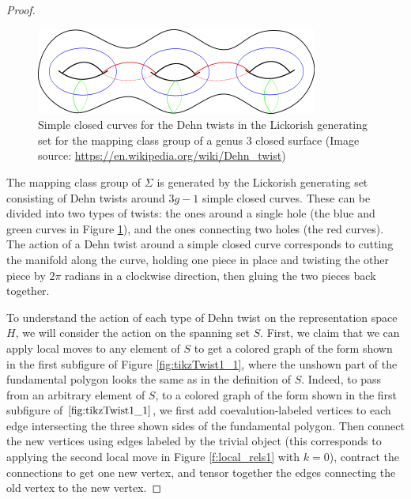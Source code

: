 \documentclass{amsart}
\newcommand{\Si}{\Sigma}
\begin{document}
\begin{proof}
\begin{figure}
 \centering
 \includegraphics[width=.60\textwidth]{lickorish.png}
 \caption{Simple closed curves for the Dehn twists in the Lickorish generating set for the mapping class group of a genus $3$ closed surface (Image source: \url{https://en.wikipedia.org/wiki/Dehn_twist})}
\label{fig:lickorish}
\end{figure}



The mapping class group of $\Si$ is generated by the Lickorish generating set consisting of Dehn twists around $3g-1$ simple closed curves.   These can be divided into two types of twists: the ones around a single hole (the blue and green curves in Figure \ref{fig:lickorish}), and the ones connecting two holes (the red curves). The action of a Dehn twist around a simple closed curve corresponds to cutting the manifold along the curve, holding one piece in place and twisting the other piece by $2\pi$ radians in a clockwise direction, then gluing the two pieces back together.


To understand the action of each type of Dehn twist on the representation space $H$, we will consider the action on the spanning set $S$.  First, we claim that we can apply local moves to any element of $S$ to get a colored graph of the form shown in the first subfigure of Figure \ref{fig:tikzTwist1_1}, where the unshown part of the fundamental polygon looks the same as in the definition of $S$.  Indeed, to pass from an arbitrary element of $S$, to a colored graph of the form shown in the first subfigure of $\ref{fig:tikzTwist1_1}$, we first add coevalution-labeled vertices to each  edge intersecting the three shown sides of the fundamental polygon.  Then connect the new vertices using edges labeled by the trivial object (this corresponds to applying the second local move in Figure \ref{f:local_rels1} with  $k = 0$), contract the connections to get one new vertex, and tensor together the edges connecting the old vertex to the new vertex.


\end{proof}
\end{document}

